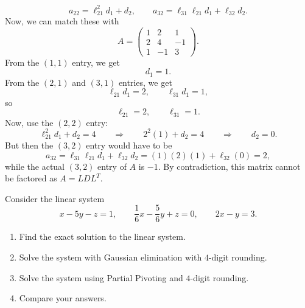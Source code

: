 \documentclass[10pt]{extarticle}
\begin{document}
\[
a_{22}=\ell_{21}^2d_1+d_2,
\qquad
a_{32}=\ell_{31}\ell_{21}d_1+\ell_{32}d_2.
\]
Now, we can match these with
\[
A=
\begin{pmatrix}
1 & 2 & 1\\
2 & 4 & -1\\
1 & -1 & 3
\end{pmatrix}.
\]
From the $(1,1)$ entry, we get
\[
d_1=1.
\]
From the $(2,1)$ and $(3,1)$ entries, we get
\[
\ell_{21}d_1=2,\qquad \ell_{31}d_1=1,
\]
so
\[
\ell_{21}=2,\qquad \ell_{31}=1.
\]
Now, use the $(2,2)$ entry:
\[
\ell_{21}^2d_1+d_2=4
\qquad \Longrightarrow \qquad
2^2(1)+d_2=4
\qquad \Longrightarrow \qquad
d_2=0.
\]
But then the $(3,2)$ entry would have to be
\[
a_{32}=\ell_{31}\ell_{21}d_1+\ell_{32}d_2=(1)(2)(1)+\ell_{32}(0)=2,
\]
while the actual $(3,2)$ entry of $A$ is $-1$. By contradiction, this matrix cannot be factored as $A=LDL^T$.

\newpage

\begin{problem}[Problem 5]
Consider the linear system
\[
x-5y-z=1,\qquad \frac{1}{6}x-\frac{5}{6}y+z=0,\qquad 2x-y=3.
\]
\begin{enumerate}[label=(\alph*)]
\item Find the exact solution to the linear system.
\item Solve the system with Gaussian elimination with $4$-digit rounding.
\item Solve the system using Partial Pivoting and $4$-digit rounding.
\item Compare your answers.
\end{enumerate}
\end{problem}
\end{document}
